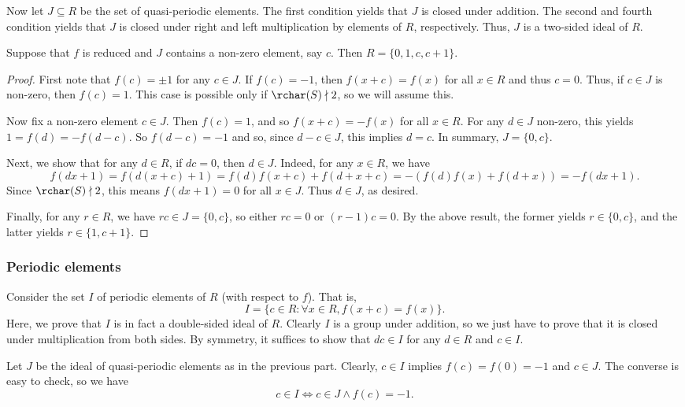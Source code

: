 Now let $J \subseteq R$ be the set of quasi-periodic elements.
The first condition yields that $J$ is closed under addition.
The second and fourth condition yields that $J$ is closed under right and left multiplication by elements of $R$, respectively.
Thus, $J$ is a two-sided ideal of $R$.

\begin{lemma}\label{2012a5-quasi-periodic-non-zero}
Suppose that $f$ is reduced and $J$ contains a non-zero element, say $c$.
Then $R = \{0, 1, c, c + 1\}$.
\end{lemma}
\begin{proof}
First note that $f(c) = \pm 1$ for any $c \in J$.
If $f(c) = -1$, then $f(x + c) = f(x)$ for all $x \in R$ and thus $c = 0$.
Thus, if $c \in J$ is non-zero, then $f(c) = 1$.
This case is possible only if $\rchar(S) \nmid 2$, so we will assume this.

Now fix a non-zero element $c \in J$.
Then $f(c) = 1$, and so $f(x + c) = -f(x)$ for all $x \in R$.
For any $d \in J$ non-zero, this yields $1 = f(d) = -f(d - c)$.
So $f(d - c) = -1$ and so, since $d - c \in J$, this implies $d = c$.
In summary, $J = \{0, c\}$.

Next, we show that for any $d \in R$, if $dc = 0$, then $d \in J$.
Indeed, for any $x \in R$, we have
\[ f(dx + 1) = f(d(x + c) + 1) = f(d) f(x + c) + f(d + x + c) = -(f(d) f(x) + f(d + x)) = -f(dx + 1). \]
Since $\rchar(S) \nmid 2$, this means $f(dx + 1) = 0$ for all $x \in J$.
Thus $d \in J$, as desired.

Finally, for any $r \in R$, we have $rc \in J = \{0, c\}$, so either $rc = 0$ or $(r - 1)c = 0$.
By the above result, the former yields $r \in \{0, c\}$, and the latter yields $r \in \{1, c + 1\}$.
\end{proof}




\subsubsection*{Periodic elements}

Consider the set $I$ of periodic elements of $R$ (with respect to $f$).
That is, \[ I = \{c \in R : \forall x \in R, f(x + c) = f(x)\}. \]
Here, we prove that $I$ is in fact a double-sided ideal of $R$.
Clearly $I$ is a group under addition, so we just have to prove that it is closed under multiplication from both sides.
By symmetry, it suffices to show that $dc \in I$ for any $d \in R$ and $c \in I$.

Let $J$ be the ideal of quasi-periodic elements as in the previous part.
Clearly, $c \in I$ implies $f(c) = f(0) = -1$ and $c \in J$.
The converse is easy to check, so we have
\[ c \in I \iff c \in J \wedge f(c) = -1. \]

